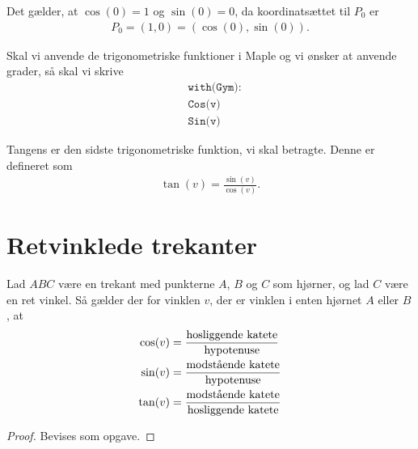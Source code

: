 \begin{exa}
Det gælder, at $\cos(0) = 1$ og $\sin(0)=0$, da koordinatsættet til $P_0$ er 
\begin{align*}
P_0 = (1,0) = (\cos(0),\sin(0)).
\end{align*}
\end{exa}

Skal vi anvende de trigonometriske funktioner i Maple og vi ønsker at anvende grader, så skal vi skrive
\begin{align*}
	&\texttt{with(Gym):} \\
	&\texttt{Cos(v)} \\	
	&\texttt{Sin(v)}
\end{align*}



Tangens er den sidste trigonometriske funktion, vi skal betragte. Denne er defineret som 
\begin{align*}
\tan(v) = \frac{\sin(v)}{\cos(v)}.
\end{align*}


\section*{Retvinklede trekanter}

\begin{setn}
	\label{setn:trigretvinkel}
Lad $ABC$ være en trekant med punkterne $A$,  $B$ og $C$ som hjørner, og lad $C$ være en ret vinkel. Så gælder der for vinklen $v$, der er vinklen i enten hjørnet $A$ eller $B$, at 
\begin{align*}
\cos(v) &= \frac{\textnormal{hosliggende katete}}{\textnormal{hypotenuse}}\\
\sin(v) &= \frac{\textnormal{modstående katete}}{\textnormal{hypotenuse}}\\
\tan(v) &= \frac{\textnormal{modstående katete}}{\textnormal{hosliggende katete}}
\end{align*}
\end{setn}
\begin{proof}
Bevises som opgave.
\end{proof}


